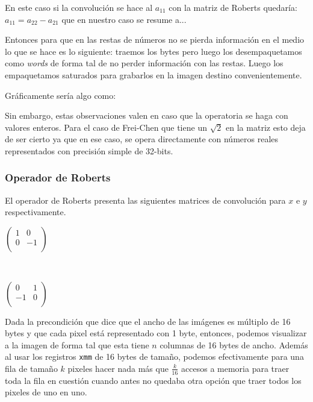 En este caso si la convolución se hace al $a_{11}$ con la matriz de Roberts quedaría: $a_{11} = a_{22} - a_{21}$ que en nuestro caso se resume a...

Entonces para que en las restas de números no se pierda información en el medio lo que se hace es lo siguiente: traemos los bytes pero luego los desempaquetamos como \emph{words} de forma tal de no perder información con las restas. Luego los empaquetamos saturados para grabarlos en la imagen destino convenientemente. 

\pagebreak
Gráficamente sería algo como: 


Sin embargo, estas observaciones valen en caso que la operatoria se haga con valores enteros. Para el caso de Frei-Chen que tiene un $\sqrt{2}$ en la matriz esto deja de ser cierto ya que en ese caso, se opera directamente con números reales representados con precisión simple de 32-bits.

\subsubsection{Operador de Roberts}

El operador de Roberts presenta las siguientes matrices de convolución para $x$ e $y$ respectivamente.

\begin{center}
\begin{minipage}{0.30 \textwidth}
$\begin{pmatrix}
1 & 0 \\
0 & -1  \\
\end{pmatrix}$
\end{minipage}
\ \ 
 \begin{minipage}{0.30 \textwidth}
$\begin{pmatrix}
0 & 1 \\
-1 & 0 \\
\end{pmatrix}$
\end{minipage}
\end{center}

Dada la precondición que dice que el ancho de las imágenes es múltiplo de 16 bytes y que cada pixel está representado con 1 byte, entonces, podemos visualizar a la imagen de forma tal que esta tiene $n$ columnas de 16 bytes de ancho. Además al usar los registros \texttt{xmm} de 16 bytes de tamaño, podemos efectivamente para una fila de tamaño $k$ pixeles hacer nada más que $\frac{k}{16}$ accesos a memoria para traer toda la fila en cuestión cuando antes no quedaba otra opción que traer todos los pixeles de uno en uno. 

